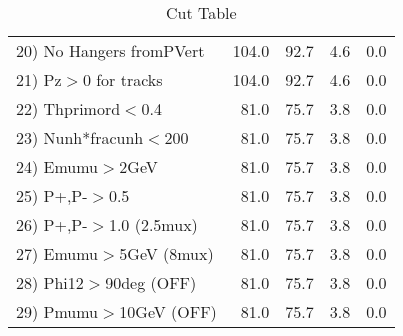 \begin{table}[h!]
\begin{tabular}{||l||r|r|r|r||}
 20) No Hangers fromPVert &       104.0 &        92.7 &         4.6 &         0.0 \\
 21) Pz$>$0 for tracks    &       104.0 &        92.7 &         4.6 &         0.0 \\
 22) Thprimord$<$0.4      &        81.0 &        75.7 &         3.8 &         0.0 \\
 23) Nunh*fracunh$<$200   &        81.0 &        75.7 &         3.8 &         0.0 \\
 24) Emumu$>$2GeV         &        81.0 &        75.7 &         3.8 &         0.0 \\
 25) P+,P-$>$0.5          &        81.0 &        75.7 &         3.8 &         0.0 \\
 26) P+,P-$>$1.0 (2.5mux) &        81.0 &        75.7 &         3.8 &         0.0 \\
 27) Emumu$>$5GeV  (8mux) &        81.0 &        75.7 &         3.8 &         0.0 \\
 28) Phi12$>$90deg  (OFF) &        81.0 &        75.7 &         3.8 &         0.0 \\
 29) Pmumu$>$10GeV  (OFF) &        81.0 &        75.7 &         3.8 &         0.0 \\
 \hline
 \hline
 \end{tabular}
 \caption{Cut Table \cohrp  }
 \label{tab-cut_crhop}
 \end{table}
